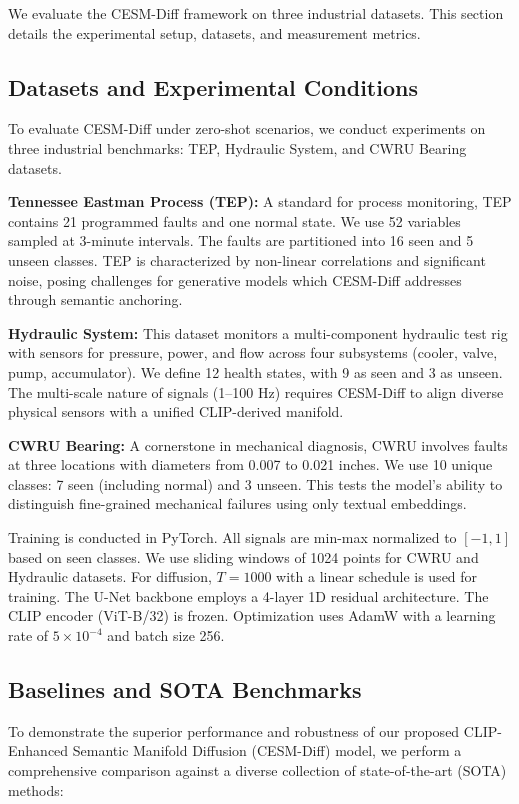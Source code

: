 \documentclass[journal]{IEEEtran}
\begin{document}
We evaluate the CESM-Diff framework on three industrial datasets. This section details the experimental setup, datasets, and measurement metrics.

\subsection{Datasets and Experimental Conditions}
To evaluate CESM-Diff under zero-shot scenarios, we conduct experiments on three industrial benchmarks: TEP, Hydraulic System, and CWRU Bearing datasets.

\textbf{Tennessee Eastman Process (TEP):} A standard for process monitoring, TEP contains 21 programmed faults and one normal state. We use 52 variables sampled at 3-minute intervals. The faults are partitioned into 16 seen and 5 unseen classes. TEP is characterized by non-linear correlations and significant noise, posing challenges for generative models which CESM-Diff addresses through semantic anchoring.

\textbf{Hydraulic System:} This dataset monitors a multi-component hydraulic test rig with sensors for pressure, power, and flow across four subsystems (cooler, valve, pump, accumulator). We define 12 health states, with 9 as seen and 3 as unseen. The multi-scale nature of signals (1--100 Hz) requires CESM-Diff to align diverse physical sensors with a unified CLIP-derived manifold.

\textbf{CWRU Bearing:} A cornerstone in mechanical diagnosis, CWRU involves faults at three locations with diameters from 0.007 to 0.021 inches. We use 10 unique classes: 7 seen (including normal) and 3 unseen. This tests the model's ability to distinguish fine-grained mechanical failures using only textual embeddings.

Training is conducted in PyTorch. All signals are min-max normalized to $[-1, 1]$ based on seen classes. We use sliding windows of 1024 points for CWRU and Hydraulic datasets. For diffusion, $T=1000$ with a linear schedule is used for training. The U-Net backbone employs a 4-layer 1D residual architecture. The CLIP encoder (ViT-B/32) is frozen. Optimization uses AdamW with a learning rate of $5 \times 10^{-4}$ and batch size 256.

\subsection{Baselines and SOTA Benchmarks}
To demonstrate the superior performance and robustness of our proposed CLIP-Enhanced Semantic Manifold Diffusion (CESM-Diff) model, we perform a comprehensive comparison against a diverse collection of state-of-the-art (SOTA) methods:
\end{document}
